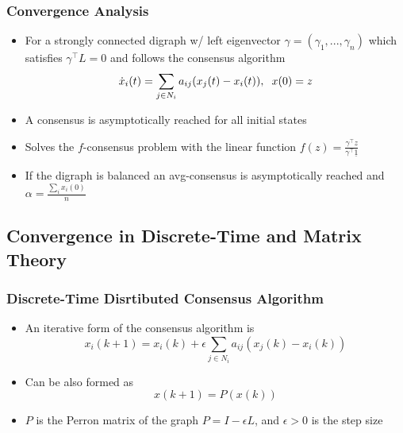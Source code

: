 \documentclass{beamer}
\begin{document}

\begin{frame}
\frametitle{Convergence Analysis}
\begin{itemize}
\item For a strongly connected digraph w/ left eigenvector $\gamma=(\gamma_1, ..., \gamma_n)$ which satisfies $\gamma^{\intercal}L=0$ and follows the consensus algorithm
\begin{equation*}
\dot{x}_i(t)=\sum_{j\in N_i}a_{ij}(x_j(t)-x_i(t)), \hspace{.2cm} x(0)=z
\end{equation*}
\item A consensus is asymptotically reached for all initial states
\item Solves the $f$-consensus problem with the linear function $f(z)=\frac{\gamma^{\intercal}z}{\gamma^{\intercal}\underline{1}}$
\item If the digraph is balanced an avg-consensus is asymptotically reached and $\alpha=\frac{\sum_ix_i(0)}{n}$
\end{itemize}
\end{frame}

\subsection{Convergence in Discrete-Time and Matrix Theory}

\begin{frame}
\frametitle{Discrete-Time Disrtibuted Consensus Algorithm}
\begin{itemize}
\item An iterative form of the consensus algorithm is
\begin{equation*}
x_i(k+1)=x_i(k)+\epsilon \sum_{j\in N_i}a_{ij}(x_j(k)-x_i(k))
\end{equation*}
\item Can be also formed as 
\begin{equation*}
x(k+1)=P(x(k))
\end{equation*}
\item $P$ is the Perron matrix of the graph $P=I-\epsilon L$, and $\epsilon>0$ is the step size 
\end{itemize}
\end{frame}

\end{document}
